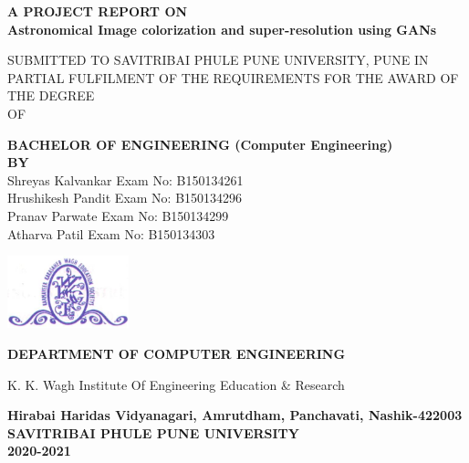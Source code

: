 \documentclass[oneside,a4paper,12pt]{report}
\begin{document}
\setlength{\parindent}{0mm}
\begin{center}
{\bfseries A  PROJECT REPORT ON \\}
 \vspace*{2\baselineskip}
{\bfseries \fontsize{16}{12} \selectfont Astronomical Image colorization and super-resolution using GANs \\ \vspace*{2\baselineskip}}
{\fontsize{12}{12} \selectfont SUBMITTED TO SAVITRIBAI PHULE PUNE UNIVERSITY, PUNE IN PARTIAL FULFILMENT OF THE REQUIREMENTS FOR THE AWARD OF THE DEGREE \\ 
OF

\vspace*{2\baselineskip}}
{\bfseries \fontsize{14}{12} \selectfont BACHELOR OF ENGINEERING (Computer
Engineering) \\
\vspace*{1\baselineskip}}
{\bfseries \fontsize{14}{12} \selectfont BY \\
\vspace*{1\baselineskip}}
Shreyas Kalvankar  \hspace{25 mm} Exam No: B150134261 \\
Hrushikesh Pandit \hspace{26 mm} Exam No: B150134296  \\
Pranav Parwate \hspace{30 mm} Exam No: B150134299 \\
Atharva Patil \hspace{34 mm} Exam No: B150134303\\
\vspace*{2\baselineskip}


\includegraphics[width=100pt]{collegelogo.png} \\
{\bfseries \fontsize{16}{12} \selectfont DEPARTMENT OF COMPUTER ENGINEERING \\ 
 \vspace*{1\baselineskip}

K. K. Wagh Institute Of Engineering Education \& Research\\ 
}
 \vspace*{1\baselineskip}
{\bfseries \fontsize{12}{12} \selectfont 
Hirabai Haridas Vidyanagari, Amrutdham, Panchavati, Nashik-422003 
\vspace*{1\baselineskip}}
{\bfseries \fontsize{12}{12} \selectfont 
SAVITRIBAI PHULE PUNE UNIVERSITY\\
2020-2021
}
\end{center}
\end{document}

